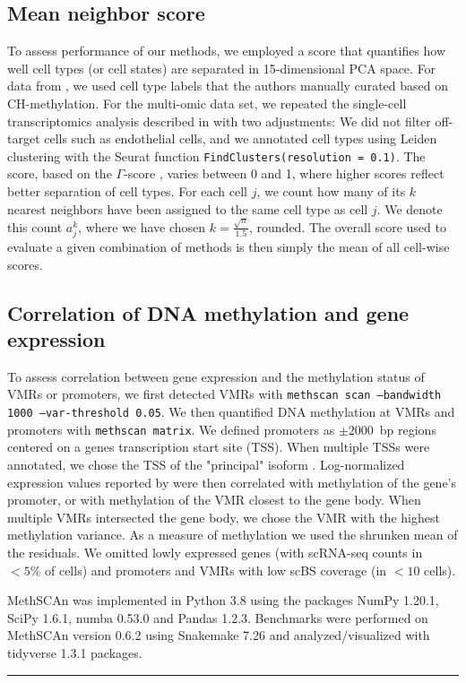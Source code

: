 \documentclass[10pt]{article}
\begin{document}
\subsection*{Mean neighbor score} \label{methods:score}
To assess performance of our methods, we employed a score that quantifies how well cell types (or cell states) are separated in 15-dimensional PCA space.
For data from \citet{luo2017single}, we used cell type labels that the authors manually curated based on CH-methylation.
For the multi-omic data set, we repeated the single-cell transcriptomics analysis described in \citet{kremer_scnmt} with two adjustments:
We did not filter off-target cells such as endothelial cells, and we annotated cell types using Leiden clustering with the Seurat \citep{seurat5} function \texttt{FindClusters(resolution = 0.1)}.
The score, based on the $\Gamma$-score \citep{Kireeva_2014}, varies between 0 and 1, where higher scores reflect better separation of cell types.
For each cell $j$, we count how many of its $k$ nearest neighbors have been assigned to the same cell type as cell $j$.
We denote this count $a^k_j$, where we have chosen $k=\frac{\sqrt{n}}{1.5}$, rounded.
The overall score used to evaluate a given combination of methods is then simply the mean of all cell-wise scores.

\subsection*{Correlation of DNA methylation and gene expression}
To assess correlation between gene expression and the methylation status of VMRs or promoters, we first detected VMRs with \texttt{methscan scan --bandwidth 1000 --var-threshold 0.05}.
We then quantified DNA methylation at VMRs and promoters with \texttt{methscan matrix}.
We defined promoters as $\pm2000$~bp regions centered on a genes transcription start site (TSS).
When multiple TSSs were annotated, we chose the TSS of the "principal" isoform \citep{appris}.
Log-normalized expression values reported by \citet{kremer_scnmt} were then correlated with methylation of the gene's promoter, or with methylation of the VMR closest to the gene body.
When multiple VMRs intersected the gene body, we chose the VMR with the highest methylation variance.
As a measure of methylation we used the shrunken mean of the residuals.
We omitted lowly expressed genes (with scRNA-seq counts in $<5\%$ of cells) and promoters and VMRs with low scBS coverage (in $<10$ cells).

MethSCAn was implemented in Python 3.8 using the packages NumPy 1.20.1, SciPy 1.6.1, numba 0.53.0 and Pandas 1.2.3. Benchmarks were performed on MethSCAn version 0.6.2 using Snakemake 7.26 and analyzed/visualized with tidyverse 1.3.1 packages. 
\vspace{1.4ex}
\noindent\hfil\rule{.6\columnwidth}{.2pt}\hfil
\end{document}
